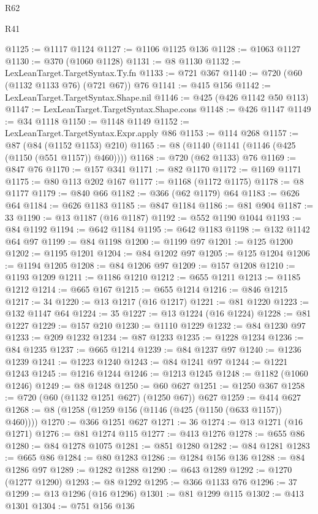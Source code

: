 \begin{lexlean}{R62}
\begin{lexlean}{R41}
\begin{coremodule}
{{{{{{{{{{{{{{{{{{{{{{{{{{{{{{{{{{{{{{{{{{{{{{{{{{{{{{{{{{{{{{{{{{{{{{{{{{{{{{{{{{{{{{{@1125 := @1117 @1124
@1127 := @1106 @1125 @136
@1128 := @1063 @1127
@1130 := @370 (@1060 @1128)
@1131 := @8 @1130
@1132 := LexLeanTarget.TargetSyntax.Ty.fn
@1133 := @721 @367
@1140 := @720 (@60 (@1132 @1133 @76) (@721 @67)) @76
@1141 := @415 @156
@1142 := LexLeanTarget.TargetSyntax.Shape.nil
@1146 := @425 (@426 @1142 @50 @113)
@1147 := LexLeanTarget.TargetSyntax.Shape.cons
@1148 := @426 @1147
@1149 := @34 @1118
@1150 := @1148 @1149
@1152 := LexLeanTarget.TargetSyntax.Expr.apply @86
@1153 := @114 @268
@1157 := @87 (@84 (@1152 @1153) @210)
@1165 := @8 (@1140 (@1141 (@1146 (@425 (@1150 (@551 @1157)) @460))))
@1168 := @720 (@62 @1133) @76
@1169 := @847 @76
@1170 := @157 @341
@1171 := @82 @1170
@1172 := @1169 @1171
@1175 := @80 @113 @202 @167
@1177 := @1168 (@1172 @1175)
@1178 := @8 @1177
@1179 := @840 @66
@1182 := @366 (@62 @1179) @64
@1183 := @626 @64
@1184 := @626 @1183
@1185 := @847 @1184
@1186 := @81 @904
@1187 := 33
@1190 := @13 @1187 (@16 @1187)
@1192 := @552 @1190 @1044
@1193 := @84 @1192
@1194 := @642 @1184
@1195 := @642 @1183
@1198 := @132 @1142 @64 @97
@1199 := @84 @1198
@1200 := @1199 @97
@1201 := @125 @1200
@1202 := @1195 @1201
@1204 := @84 @1202 @97
@1205 := @125 @1204
@1206 := @1194 @1205
@1208 := @84 @1206 @97
@1209 := @157 @1208
@1210 := @1193 @1209
@1211 := @1186 @1210
@1212 := @655 @1211
@1213 := @1185 @1212
@1214 := @665 @167
@1215 := @655 @1214
@1216 := @846 @1215
@1217 := 34
@1220 := @13 @1217 (@16 @1217)
@1221 := @81 @1220
@1223 := @132 @1147 @64
@1224 := 35
@1227 := @13 @1224 (@16 @1224)
@1228 := @81 @1227
@1229 := @157 @210
@1230 := @1110 @1229
@1232 := @84 @1230 @97
@1233 := @209 @1232
@1234 := @87 @1233
@1235 := @1228 @1234
@1236 := @84 @1235
@1237 := @665 @1214
@1239 := @84 @1237 @97
@1240 := @1236 @1239
@1241 := @1223 @1240
@1243 := @84 @1241 @97
@1244 := @1221 @1243
@1245 := @1216 @1244
@1246 := @1213 @1245
@1248 := @1182 (@1060 @1246)
@1249 := @8 @1248
@1250 := @60 @627
@1251 := @1250 @367
@1258 := @720 (@60 (@1132 @1251 @627) (@1250 @67)) @627
@1259 := @414 @627
@1268 := @8 (@1258 (@1259 @156 (@1146 (@425 (@1150 (@633 @1157)) @460))))
@1270 := @366 @1251 @627
@1271 := 36
@1274 := @13 @1271 (@16 @1271)
@1276 := @81 @1274 @115
@1277 := @413 @1276
@1278 := @655 @86
@1280 := @84 @1278 @1075
@1281 := @851 @1280
@1282 := @84 @1281
@1283 := @665 @86
@1284 := @80 @1283
@1286 := @1284 @156 @136
@1288 := @84 @1286 @97
@1289 := @1282 @1288
@1290 := @643 @1289
@1292 := @1270 (@1277 @1290)
@1293 := @8 @1292
@1295 := @366 @1133 @76
@1296 := 37
@1299 := @13 @1296 (@16 @1296)
@1301 := @81 @1299 @115
@1302 := @413 @1301
@1304 := @751 @156 @136
}}}}}}}}}}}}}}}}}}}}}}}}}}}}}}}}}}}}}}}}}}}}}}}}}}}}}}}}}}}}}}}}}}}}}}}}}}}}}}}}}}}}}}}
\end{coremodule}
\end{lexlean}
\end{lexlean}
